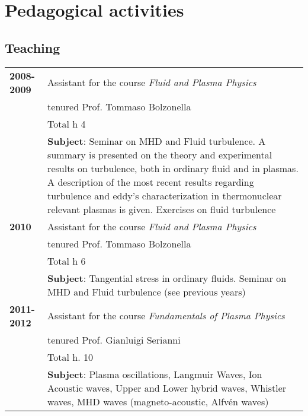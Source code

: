 \section{Pedagogical activities}
\subsection{Teaching}
\begin{longtable}{>{\bfseries}l p{15cm}}
2008-2009 & Assistant for the course \emph{Fluid and Plasma
  Physics} \\
& tenured
Prof. Tommaso Bolzonella  \\
 & Total h 4  \\ 
& \textbf{Subject}: Seminar on MHD and Fluid turbulence. 
A summary is presented on the theory and experimental results on turbulence, both in
ordinary fluid and in plasmas. A description of the most
recent results regarding turbulence and eddy’s characterization in
thermonuclear relevant plasmas is given. Exercises on fluid turbulence \\
2010 &  Assistant for the course \emph{Fluid and Plasma
  Physics} \\ 
& tenured
Prof. Tommaso Bolzonella  \\
 & Total h 6  \\
& \textbf{Subject}: Tangential stress in ordinary
fluids. Seminar on MHD and Fluid turbulence (see previous years)  \\
2011-2012 & Assistant for the course \emph{Fundamentals of Plasma
  Physics} \\ 
& tenured Prof. Gianluigi Serianni \\
& Total h. 10  \\
& \textbf{Subject}: Plasma oscillations, Langmuir Waves, Ion Acoustic
waves, Upper and Lower hybrid waves, Whistler waves, MHD waves
(magneto-acoustic, Alfv\'en waves)
\end{longtable}

